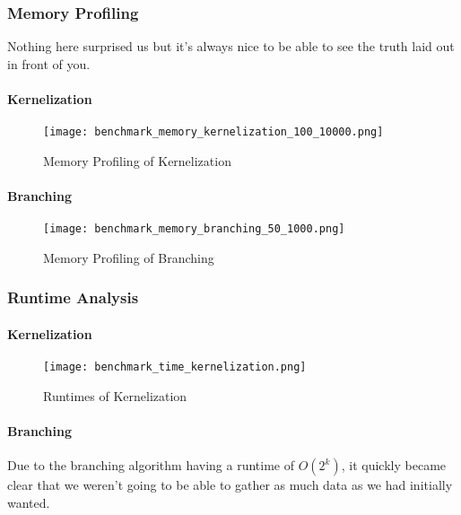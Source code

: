 \subsubsection{Memory Profiling}

Nothing here surprised us but it's always nice to be able to see the truth laid
out in front of you.

\paragraph{Kernelization}

\begin{figure}[H]
    \centering
    \texttt{[image: benchmark\_memory\_kernelization\_100\_10000.png]}
    \caption{Memory Profiling of Kernelization}
    \label{fig:benchmark_mem_kernelization}
\end{figure}

\paragraph{Branching}

\begin{figure}[H]
    \centering
    \texttt{[image: benchmark\_memory\_branching\_50\_1000.png]}
    \caption{Memory Profiling of Branching}
    \label{fig:benchmark_mem_branching}
\end{figure}

\subsubsection{Runtime Analysis}

\paragraph{Kernelization}

\begin{figure}[H]
    \centering
    \texttt{[image: benchmark\_time\_kernelization.png]}
    \caption{Runtimes of Kernelization}
    \label{fig:benchmark_time_kernelization}
\end{figure}

\paragraph{Branching}

Due to the branching algorithm having a runtime of \(O(2^k)\), it quickly
became clear that we weren't going to be able to gather as much data as we had
initially wanted.

